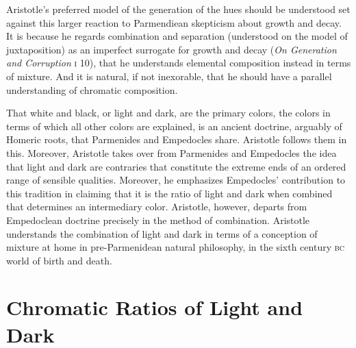 Aristotle's preferred model of the generation of the hues should be understood set against this larger reaction to Parmendiean skepticism about growth and decay. It is because he regards combination and separation (understood on the model of juxtaposition) as an imperfect surrogate for growth and decay (\emph{On Generation and Corruption} \textsc{i} 10), that he understands elemental composition instead in terms of mixture. And it is natural, if not inexorable, that he should have a parallel understanding of chromatic composition.

That white and black, or light and dark, are the primary colors, the colors in terms of which all other colors are explained, is an ancient doctrine, arguably of Homeric roots, that Parmenides and Empedocles share. Aristotle follows them in this. Moreover, Aristotle takes over from Parmenides and Empedocles the idea that light and dark are contraries that constitute the extreme ends of an ordered range of sensible qualities. Moreover, he emphasizes Empedocles' contribution to this tradition in claiming that it is the ratio of light and dark when combined that determines an intermediary color. Aristotle, however, departs from Empedoclean doctrine precisely in the method of combination. Aristotle understands the combination of light and dark in terms of a conception of mixture at home in pre-Parmenidean natural philosophy, in the sixth century \textsc{bc} world of birth and death.



\section{Chromatic Ratios of Light and Dark} %
\label{sec:chromatic_ratios_of_light_and_dark}




